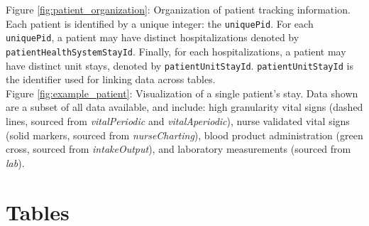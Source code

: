 \documentclass[english]{article}
\newcommand{\colname}[1]{\texttt{#1}}
\newcommand{\tblname}[1]{\emph{#1}}
\begin{document}

\noindent
Figure \ref{fig:patient_organization}: Organization of patient tracking information. Each patient is identified by a unique integer: the \colname{uniquePid}. For each \colname{uniquePid}, a patient may have distinct hospitalizations denoted by \colname{patientHealthSystemStayId}. Finally, for each hospitalizations, a patient may have distinct unit stays, denoted by \colname{patientUnitStayId}. \colname{patientUnitStayId} is the identifier used for linking data across tables.\\

\noindent
Figure \ref{fig:example_patient}: Visualization of a single patient's stay. Data shown are a subset of all data available, and include: high granularity vital signs (dashed lines, sourced from \tblname{vitalPeriodic} and \tblname{vitalAperiodic}), nurse validated vital signs (solid markers, sourced from \tblname{nurseCharting}), blood product administration (green cross, sourced from \tblname{intakeOutput}), and laboratory measurements (sourced from \tblname{lab}).

\clearpage
\section*{Tables}



\end{document}
